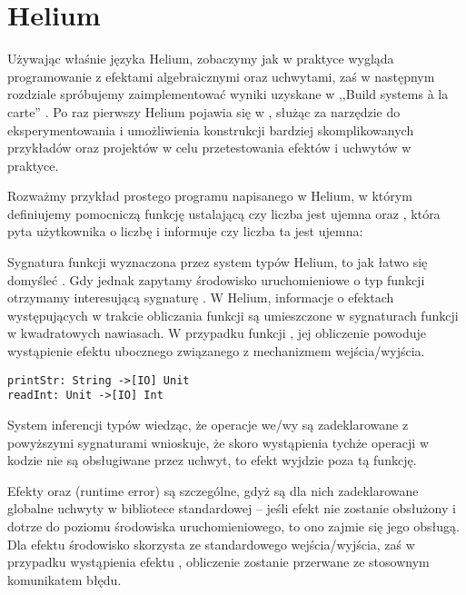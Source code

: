 \section{Helium}

\lstset{language=Haleff, showstringspaces=false}

Używając właśnie języka Helium, zobaczymy jak w praktyce wygląda programowanie z efektami algebraicznymi oraz uchwytami, zaś w następnym rozdziale spróbujemy zaimplementować wyniki uzyskane w ,,Build systems {\`a} la carte'' \cite{mokhov2018build, mokhov2020build}. Po raz pierwszy Helium pojawia się w \cite{biernacki2019abstracting}, służąc za narzędzie do eksperymentowania i umożliwienia konstrukcji bardziej skomplikowanych przykładów oraz projektów w celu przetestowania efektów i uchwytów w praktyce.

Rozważmy przykład prostego programu napisanego w Helium, w którym definiujemy pomocniczą funkcję  ustalającą czy liczba jest ujemna oraz , która pyta użytkownika o liczbę i informuje czy liczba ta jest ujemna:



Sygnatura funkcji  wyznaczona przez system typów Helium, to jak łatwo się domyśleć . Gdy jednak zapytamy środowisko uruchomieniowe o typ funkcji  otrzymamy interesującą sygnaturę . W Helium, informacje o efektach występujących w trakcie obliczania funkcji są umieszczone w sygnaturach funkcji w kwadratowych nawiasach. W przypadku funkcji , jej obliczenie powoduje wystąpienie efektu ubocznego związanego z mechanizmem wejścia/wyjścia. 

\begin{lstlisting}
printStr: String ->[IO] Unit
readInt: Unit ->[IO] Int
\end{lstlisting}

System inferencji typów wiedząc, że operacje we/wy są zadeklarowane z powyższymi sygnaturami wnioskuje, że skoro wystąpienia tychże operacji w kodzie  nie są obsługiwane przez uchwyt, to efekt  wyjdzie poza tą funkcję.

Efekty  oraz  (runtime error) są szczególne, gdyż są dla nich zadeklarowane globalne uchwyty w bibliotece standardowej -- jeśli efekt nie zostanie obsłużony i dotrze do poziomu środowiska uruchomieniowego, to ono zajmie się jego obsługą. Dla efektu  środowisko skorzysta ze standardowego wejścia/wyjścia, zaś w przypadku wystąpienia efektu , obliczenie zostanie przerwane ze stosownym komunikatem błędu.

